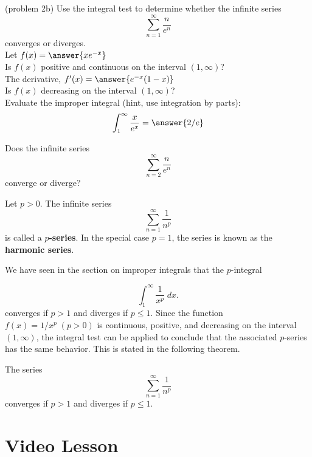 \documentclass{ximera}
\begin{document}
\begin{problem}(problem 2b)
Use the integral test to determine whether the infinite series
\[
\sum_{n=1}^\infty \frac{n}{e^n}
\]
converges or diverges.\\

Let $f(x) = \answer{xe^{-x}}$\\

Is $f(x)$ positive and continuous on the interval $(1, \infty)$?\\ %

The derivative, $f'(x) = \answer{e^{-x}(1-x)}$\\

Is $f(x)$ decreasing on the interval $(1, \infty)$? \\


Evaluate the improper integral (hint, use integration by parts): 
\[
 \int_1^\infty \frac{x}{e^x} = \answer{2/e}
\]

Does the infinite series
\[
\sum_{n=2}^\infty \frac{n}{e^n}
\]
converge or diverge? 


\end{problem}


\begin{definition}[p-series]
Let $p > 0$. The infinite series
\[
\sum_{n=1}^\infty \frac{1}{n^p}
\]
is called a \textbf{$p$-series}. In the special case $p = 1$, the series is known as the \textbf{harmonic series}.
\end{definition}

We have seen in the section on improper integrals that the $p$-integral

\[
\int_1^\infty \frac{1}{x^p} \; dx.
\]
converges if $p > 1$ and diverges if $p \leq 1$.
Since the function $f(x) = 1/x^p \; (p > 0)$ is continuous, positive, and decreasing on the interval $(1, \infty)$,
the integral test can be applied to conclude that the associated $p$-series has the same behavior.  This is stated in the following theorem.


\begin{theorem}[$p$-series]
The series
\[
\sum_{n=1}^\infty \frac{1}{n^p}
\]
converges if $p > 1$ and diverges if $p \leq 1$.
\end{theorem}



\section{Video Lesson}

\begin{center}
\begin{foldable}
\end{foldable}
\end{center}
\end{document}
